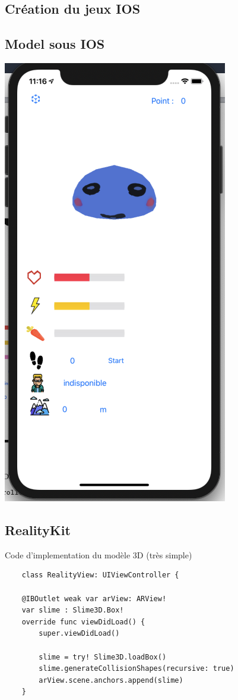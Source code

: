 \documentclass{article}
\begin{document}
\subsection{Création du jeux IOS}
\subsection{Model sous IOS }
\begin{center}
  \includegraphics[scale=0.4]{iphone02.png}
\end{center}
\subsection{RealityKit}
Code d'implementation du modèle 3D (très simple)
\begin{verbatim}
    class RealityView: UIViewController {

    @IBOutlet weak var arView: ARView!
    var slime : Slime3D.Box!
    override func viewDidLoad() {
        super.viewDidLoad()

        slime = try! Slime3D.loadBox()
        slime.generateCollisionShapes(recursive: true)
        arView.scene.anchors.append(slime)
    }
    
\end{verbatim}
\newpage
\end{document}
